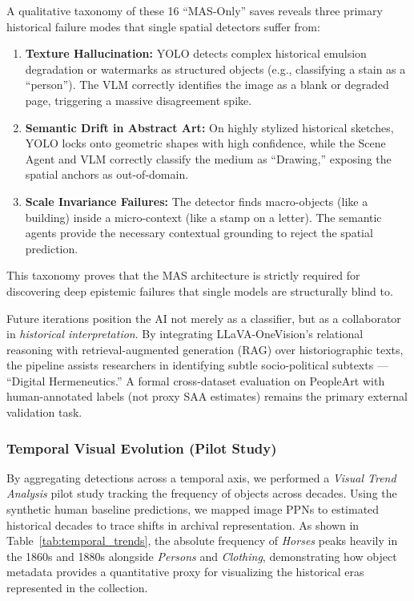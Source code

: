 \documentclass[12pt,onecolumn,a4paper]{IEEEtran}
\begin{document}
A qualitative taxonomy of these 16 ``MAS-Only'' saves reveals three primary historical failure modes that single spatial detectors suffer from:
\begin{enumerate}
    \item \textbf{Texture Hallucination:} YOLO detects complex historical emulsion degradation or watermarks as structured objects (e.g., classifying a stain as a ``person''). The VLM correctly identifies the image as a blank or degraded page, triggering a massive disagreement spike.
    \item \textbf{Semantic Drift in Abstract Art:} On highly stylized historical sketches, YOLO locks onto geometric shapes with high confidence, while the Scene Agent and VLM correctly classify the medium as ``Drawing,'' exposing the spatial anchors as out-of-domain.
    \item \textbf{Scale Invariance Failures:} The detector finds macro-objects (like a building) inside a micro-context (like a stamp on a letter). The semantic agents provide the necessary contextual grounding to reject the spatial prediction.
\end{enumerate}
This taxonomy proves that the MAS architecture is strictly required for discovering deep epistemic failures that single models are structurally blind to.

Future iterations position the AI not merely as a classifier, but as a collaborator in \textit{historical interpretation}. By integrating LLaVA-OneVision's relational reasoning with retrieval-augmented generation (RAG) over historiographic texts, the pipeline assists researchers in identifying subtle socio-political subtexts --- ``Digital Hermeneutics.'' A formal cross-dataset evaluation on PeopleArt \cite{westlake2016} with human-annotated labels (not proxy SAA estimates) remains the primary external validation task.

\subsubsection{Temporal Visual Evolution (Pilot Study)}
By aggregating detections across a temporal axis, we performed a \textit{Visual Trend Analysis} pilot study tracking the frequency of objects across decades. Using the synthetic human baseline predictions, we mapped image PPNs to estimated historical decades to trace shifts in archival representation. As shown in Table~\ref{tab:temporal_trends}, the absolute frequency of \textit{Horses} peaks heavily in the 1860s and 1880s alongside \textit{Persons} and \textit{Clothing}, demonstrating how object metadata provides a quantitative proxy for visualizing the historical eras represented in the collection.
\end{document}

